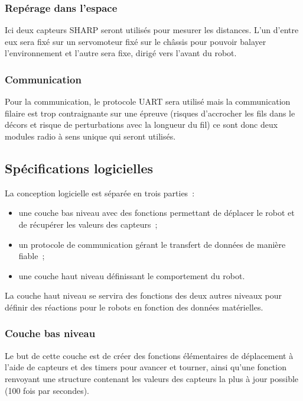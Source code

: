 \documentclass{article}
\begin{document}
\subsubsection{Repérage dans l'espace}

Ici deux capteurs SHARP seront utilisés pour mesurer les distances. L’un d’entre eux sera fixé sur un servomoteur fixé sur le châssis pour pouvoir balayer l’environnement et l’autre sera fixe, dirigé vers l’avant du robot.

\subsubsection{Communication}

Pour la communication, le protocole UART sera utilisé mais la communication filaire est trop contraignante sur une épreuve (risques d’accrocher les fils dans le décors et risque de perturbations  avec la longueur du fil) ce sont donc deux modules radio à sens unique qui seront utilisés.

\subsection{Spécifications logicielles}

La conception logicielle est séparée en trois parties~: \\

\begin{itemize}
  \item une couche bas niveau avec des fonctions permettant de déplacer le robot et de récupérer les valeurs des capteurs~;
  \item un protocole de communication gérant le transfert de données de manière fiable~;
  \item une couche haut niveau définissant le comportement du robot.
\end{itemize}

La couche haut niveau se servira des fonctions des deux autres niveaux pour définir des réactions pour le robots en fonction des données matérielles.

\subsubsection{Couche bas niveau}

Le but de cette couche est de créer des fonctions élémentaires de déplacement à l’aide de capteurs et des timers pour avancer et tourner, ainsi qu’une fonction renvoyant une structure contenant les valeurs des capteurs la plus à jour possible (100 fois par secondes). \\
\end{document}
